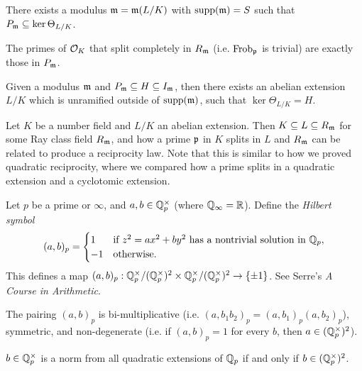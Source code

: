 \begin{prop}
  There exists a modulus $\mathfrak{m} = \mathfrak{m}(L / K)$
  with
  $\operatorname{supp}(\mathfrak{m}) = S$ such that
  $P_{\mathfrak{m}} \subseteq \ker \Theta_{L / K}$.
\end{prop}

\begin{remark}
  The primes of $\mathcal{O}_K$ that split
  completely in $R_{\mathfrak{m}}$ (i.e. $\operatorname{Frob}_{\mathfrak{p}}$ is
  trivial) are exactly those
  in $P_{\mathfrak{m}}$.
\end{remark}

\begin{prop}
  Given a modulus $\mathfrak{m}$ and
  $P_{\mathfrak{m}} \subseteq H \subseteq I_{\mathfrak{m}}$, then
  there exists an abelian extension $L / K$
  which is unramified outside of $\operatorname{supp}(\mathfrak{m})$,
  such that $\ker \Theta_{L / K} = H$.
\end{prop}

\begin{example}
  Let $K$ be a number field and
  $L / K$ an abelian extension. Then
  $K \subseteq L \subseteq R_{\mathfrak{m}}$ for some
  Ray class field $R_{\mathfrak{m}}$, and
  how a prime $\mathfrak{p}$ in $K$ splits in $L$
  and $R_{\mathfrak{m}}$ can be related to produce
  a reciprocity law. Note that this is
  similar to how we proved quadratic
  reciprocity, where we compared how a
  prime splits in a quadratic extension and
  a cyclotomic extension.
\end{example}

\begin{definition}
  Let $p$ be a prime or $\infty$, and $a, b \in \mathbb{Q}_p^\times$ (where $\mathbb{Q}_\infty = \mathbb{R}$).
  Define the \emph{Hilbert symbol}
  \[
    (a, b)_p =
    \begin{cases}
      1 & \text{if $z^2 = ax^2 + by^2$ has a nontrivial solution in $\mathbb{Q}_p$}, \\
      -1 & \text{otherwise}.
    \end{cases}
  \]
  This defines a map
  $(a, b)_p : \mathbb{Q}_p^\times / (\mathbb{Q}_p^\times)^2 \times \mathbb{Q}_p^\times / (\mathbb{Q}_p^\times)^2 \to \{\pm 1\}$.
  See Serre's \emph{A Course in Arithmetic}.
\end{definition}

\begin{theorem}
  The pairing $(a, b)_p$ is bi-multiplicative
  (i.e. $(a, b_1 b_2)_p = (a, b_1)_p (a, b_2)_p$), symmetric, and non-degenerate (i.e.
  if $(a, b)_p = 1$ for every $b$,
  then $a \in (\mathbb{Q}_p^\times)^2$).
\end{theorem}

\begin{corollary}
  $b \in \mathbb{Q}_p^\times$
  is a norm from all quadratic extensions
  of $\mathbb{Q}_p$ if and only if
  $b \in (\mathbb{Q}_p^\times)^2$.
\end{corollary}


